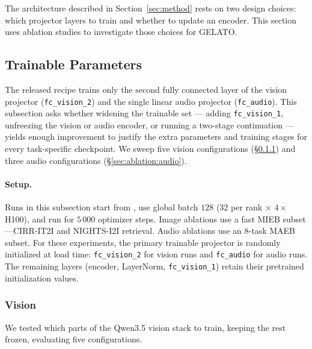 The architecture described in Section~\ref{sec:method} rests on two design choices: which projector layers to train and whether to update an encoder.
This section uses ablation studies to investigate those choices for GELATO.

\subsection{Trainable Parameters}
\label{sec:ablation:trainable-parameters}

The released recipe trains only the second fully connected layer of the vision projector (\texttt{fc\_vision\_2}) and the single linear audio projector (\texttt{fc\_audio}).
This subsection asks whether widening the trainable set --- adding \texttt{fc\_vision\_1}, unfreezing the vision or audio encoder, or running a two-stage continuation --- yields enough improvement to justify the extra parameters and training stages for every task-specific checkpoint.
We sweep five vision configurations (\S\ref{sec:ablation:vision-projector}) and three audio configurations (\S\ref{sec:ablation:audio}).

\paragraph{Setup.}
Runs in this subsection start from \omniSmallRetrieval{}, use global batch $128$ ($32$ per rank $\times$ $4\times$H100), and run for $5\,000$ optimizer steps.
Image ablations use a fast MIEB subset---CIRR-IT2I and NIGHTS-I2I retrieval.
Audio ablations use an 8-task MAEB subset.
For these experiments, the primary trainable projector is randomly initialized at load time: \texttt{fc\_vision\_2} for vision runs and \texttt{fc\_audio} for audio runs.
The remaining layers (encoder, LayerNorm, \texttt{fc\_vision\_1}) retain their pretrained initialization values.

\subsubsection{Vision}
\label{sec:ablation:vision-projector}

We tested which parts of the Qwen3.5 vision stack to train, keeping the rest frozen, evaluating five configurations.

